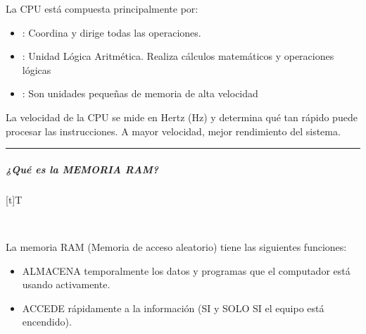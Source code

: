 \documentclass[letterpaper,10pt,spanish]{sphinxmanual}
\let\sphinxpxdimen\pdfpxdimen\else\newdimen\sphinxpxdimen
\begin{document}
\sphinxAtStartPar
La CPU está compuesta principalmente por:
\begin{itemize}
\item {} 
\sphinxAtStartPar
{}: Coordina y dirige todas las operaciones.

\item {} 
\sphinxAtStartPar
{}: Unidad Lógica Aritmética. Realiza cálculos matemáticos y operaciones lógicas

\item {} 
\sphinxAtStartPar
{}: Son unidades pequeñas de memoria de alta velocidad

\end{itemize}

\sphinxAtStartPar
La velocidad de la CPU se mide en Hertz (Hz) y determina qué tan rápido puede procesar las instrucciones. A mayor velocidad, mejor rendimiento del sistema.


\bigskip\hrule\bigskip



\subparagraph{¿Qué es la MEMORIA RAM?}
\label{\detokenize{cursos/logica8/recursos/T01:que-es-la-memoria-ram}}

\begin{savenotes}\sphinxattablestart
\sphinxthistablewithglobalstyle
\centering
\begin{tabulary}{\linewidth}[t]{T}
\sphinxtoprule
\sphinxtableatstartofbodyhook

\begin{sphinxfigure-in-table}
\centering
\capstart
\noindent\sphinxincludegraphics[width=300\sphinxpxdimen]{{image021}.png}
\label{\detokenize{cursos/logica8/recursos/T01:id14}}\end{sphinxfigure-in-table}\relax
\\
\sphinxbottomrule
\end{tabulary}
\sphinxtableafterendhook\par
\sphinxattableend\end{savenotes}

\sphinxAtStartPar
\sphinxfootnotemark[1] La memoria RAM (Memoria de acceso aleatorio) tiene las siguientes funciones:
\begin{itemize}
\item {} 
\sphinxAtStartPar
ALMACENA temporalmente los datos y programas que el computador está usando activamente.

\item {} 
\sphinxAtStartPar
ACCEDE rápidamente a la información (SI y SOLO SI el equipo está encendido).

\end{itemize}
\end{document}
